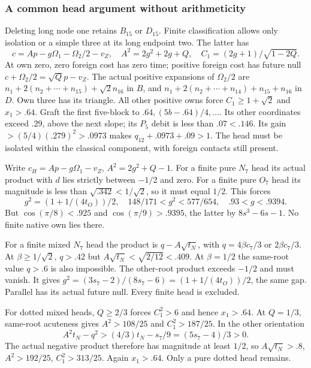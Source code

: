 \subsubsection{A common head argument without arithmeticity}
Deleting long node one retains \(B_{15}\) or \(D_{15}\).
Finite classification allows only isolation or a simple three at
its long endpoint two. The latter has
\[
 c=Ap-g\Omega_1-\Omega_2/2-v_Z,\quad
 A^2=2g^2+2g+Q,\quad C_1=(2g+1)/\sqrt{1-2Q}.
\]
At own zero, zero foreign cost has zero time; positive foreign cost
has future null \(c+\Omega_2/2=\sqrt Qp-v_Z\).
The actual positive expansions of \(\Omega_2/2\) are
\(n_1+2(n_2+\cdots+n_{15})+\sqrt2n_{16}\) in \(B\), and
\(n_1+2(n_2+\cdots+n_{14})+n_{15}+n_{16}\) in \(D\).
Own three has its triangle. All other positive owns force
\(C_1\ge1+\sqrt2\) and \(x_1>.64\).
Graft the first five-block to \(.64,(5b-.64)/4,\ldots\).
Its other coordinates exceed \(.29\), above the next slope;
its \(P_5\) debit is less than \(.07<.146\). Its gain
\(>(5/4)(.279)^2>.0973\) makes
\(q_{12}+.0973+.09>1\). The head must be isolated within
the classical component, with foreign contacts still present.

Write \(c_H=Ap-g\Omega_1-v_Z\), \(A^2=2g^2+Q-1\).
For a finite pure \(N_7\) head its actual product with \(d\)
lies strictly between \(-1/2\) and zero. For a finite pure
\(O_7\) head its magnitude is less than \(\sqrt{.342}<1/\sqrt2\),
so it must equal \(1/2\). This forces
\[
 g^2=(1+1/(4t_O))/2,\quad148/171<g^2<577/654,
 \quad .93<g<.9394.
\]
But \(\cos(\pi/8)<.925\) and \(\cos(\pi/9)>.9395\),
the latter by \(8s^3-6s-1\). No finite native own lies there.

For a finite mixed \(N_7\) head the product is
\(q-A\sqrt{t_N}\), with
\(q=4\beta c_7/3\) or \(2\beta c_7/3\).
At \(\beta\ge1/\sqrt2\), \(q>.42\) but
\(A\sqrt{t_N}<\sqrt{2/12}<.409\). At \(\beta=1/2\)
the same-root value \(q>.6\) is also impossible. The other-root
product exceeds \(-1/2\) and must vanish. It gives
\(g^2=(3s_7-2)/(8s_7-6)=(1+1/(4t_O))/2\), the same gap.
Parallel has its actual future null. Every finite head is excluded.

For dotted mixed heads, \(Q\ge2/3\) forces \(C_1^2>6\)
and hence \(x_1>.64\). At \(Q=1/3\), same-root acuteness
gives \(A^2>108/25\) and \(C_1^2>187/25\).
In the other orientation
\[
 A^2t_N-q^2>(4/3)t_N-s_7/9=(5s_7-4)/3>0.
\]
The actual negative product therefore has magnitude at least \(1/2\),
so \(A\sqrt{t_N}>.8\), \(A^2>192/25\), \(C_1^2>313/25\).
Again \(x_1>.64\). Only a pure dotted head remains.

